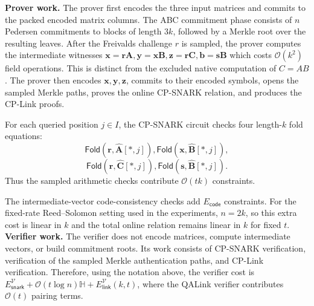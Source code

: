 \documentclass[conference,compsoc]{IEEEtran}
\newcommand{\mat}{\mathbf}          %
\newcommand{\vect}{\mathbf}         %
\newcommand{\fold}{\textsf{Fold}}
\theoremstyle{plain}
\theoremstyle{definition}
\theoremstyle{remark}
\begin{document}
\noindent\textbf{Prover work.}
The prover first encodes the three input matrices and commits to the packed
encoded matrix columns.  The ABC commitment phase consists of \(n\) Pedersen
commitments to blocks of length \(3k\), followed by a Merkle root over
the resulting leaves.  After the Freivalds challenge \(r\) is sampled, the
prover computes the intermediate witnesses
  $\vect{x}=\vect{r}\mat{A},
  \vect{y}=\vect{x}\mat{B},
  \vect{z}=\vect{r}\mat{C},
  \ensuremath{\vect{b}=\vect{s}\mat{B}}$
which costs \(\mathcal{O}(k^2)\) field operations.  This is distinct from the
excluded native computation of \(C=AB\).  The prover then encodes
\(\vect{x},\vect{y},\vect{z}\), commits to their encoded symbols, opens the
sampled Merkle paths, proves the online CP-SNARK relation, and produces the
CP-Link proofs.

For each queried position \(j\in I\), the CP-SNARK circuit checks four
length-\(k\) fold equations:
\[
  \fold(\vect{r},\widehat{\mat{A}}[*,j]),
  \fold(\vect{x},\widehat{\mat{B}}[*,j]),
\]
\[
\fold(\vect{r},\widehat{\mat{C}}[*,j]),
  \ensuremath{\fold(\vect{s},\widehat{\mat{B}}[*,j])}.
\]
Thus the sampled arithmetic checks contribute \(\mathcal{O}(tk)\) constraints. 

The intermediate-vector code-consistency checks add
\(E_{\mathsf{code}}\) constraints. For the fixed-rate
Reed--Solomon setting used in the experiments, \(n=2k\), so this extra cost is
linear in \(k\) and the total online relation remains linear in \(k\) for fixed
\(t\). \\

\noindent\textbf{Verifier work.}
The verifier does not encode matrices, compute intermediate vectors, or build
commitment roots.  Its work consists of CP-SNARK verification, verification of
the sampled Merkle authentication paths, and CP-Link verification.  Therefore,
using the notation above, the verifier cost is
$E_{\mathsf{snark}}^\mathcal{V} + \mathcal{O}(t\log n)\mathbb{H} +
E_{\mathsf{link}}^\mathcal{V}(k,t)$, where the QALink verifier contributes
\(\mathcal{O}(t)\) pairing terms. \\
\end{document}
